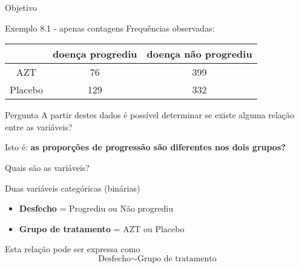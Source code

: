 \documentclass{beamer}
\begin{document}

\begin{frame}{\scriptsize Objetivo}
  \begin{exampleblock}{Exemplo 8.1 - apenas contagens}
    Frequências observadas:
    \begin{tabular}{c|c|c}
      & doença progrediu & doença não progrediu\\
      \hline
      AZT & 76 & 399 \\
      \hline
      Placebo & 129 & 332 \\
    \end{tabular}
  \end{exampleblock}
  \begin{block}{Pergunta}
    \footnotesize
    A partir destes dados é possível determinar se existe alguma relação entre as variáveis?

    Isto é: {\bf as proporções de progressão são diferentes nos dois grupos?}
  \end{block}
\end{frame}

\begin{frame}{\scriptsize Quais são as variáveis?}

  \begin{block}{Duas variáveis categóricas (binárias)}
    \footnotesize
  \begin{itemize}
  \item {\bf Desfecho} = Progrediu ou Não progrediu
  \item {\bf Grupo de tratamento} = AZT ou Placebo
  \end{itemize}
  \end{block}
  \begin{block}{Esta relação pode ser expressa como}
    \footnotesize
    \begin{displaymath}
      \text{Desfecho} \sim \text{Grupo de tratamento}
    \end{displaymath}
  \end{block}
\end{frame}
\end{document}
